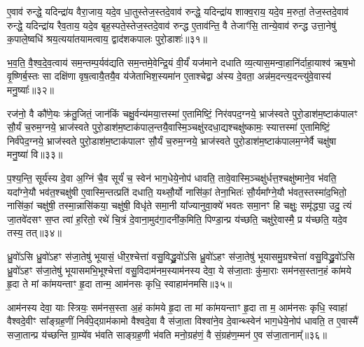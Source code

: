 ए॒वाव॑ रुन्द्धे॒ यदिन्द्रा॑य वैरा॒जाय॒ यदे॒व धा॒तुस्तेज॒स्तदे॒वाव॑ रुन्द्धे॒ यदिन्द्रा॑य शाक्व॒राय॒ यदे॒व म॒रुतां॒ तेज॒स्तदे॒वाव॑ रुन्द्धे॒ यदिन्द्रा॑य रैव॒ताय॒ यदे॒व बृह॒स्पते॒स्तेज॒स्तदे॒वाव॑ रुन्द्ध ए॒ताव॑न्ति॒ वै तेजाꣳ॑सि॒ तान्ये॒वाव॑ रुन्द्ध उत्ता॒नेषु॑ क॒पाले॒ष्वधि॑ श्रय॒त्यया॑तयामत्वाय॒ द्वाद॑शकपालः पुरो॒डाशः॑॥३१॥

भ॒व॒ति॒ वै॒श्व॒दे॒व॒त्वाय॑ सम॒न्तम्प॒र्यव॑द्यति सम॒न्तमे॒वेन्द्रि॒यं वी॒र्यं॑ यज॑माने दधाति व्य॒त्यास॒मन्वा॒हानि॑र्दाहा॒याश्व॑ ऋष॒भो वृ॒ष्णिर्ब॒स्तः सा दक्षि॑णा वृष॒त्वायै॒तयै॒व य॑जेताभिश॒स्यमा॑न ए॒ताश्चेद्वा अ॑स्य दे॒वता॒ अन्न॑म॒दन्त्य॒दन्त्यु॑वे॒वास्य॑ मनु॒ष्याः᳚॥३२॥

{\anuvakamend[{इ॒न्द्रि॒यका॑मः सवि॒तुस्तेज॒स्तत्पु॑रो॒डाशो॒\-ऽष्टात्रिꣳ॑शच्च॥७॥}]}

रज॑नो॒ वै कौ॑णे॒यः क्र॑तु॒जितं॒ जान॑किं चक्षु॒र्वन्य॑मया॒त्तस्मा॑ ए॒तामिष्टिं॒ निर॑वपद॒ग्नये॒ भ्राज॑स्वते पुरो॒डाश॑म॒ष्टाक॑पालꣳ सौ॒र्यं च॒रुम॒ग्नये॒ भ्राज॑स्वते पुरो॒डाश॑म॒ष्टाक॑पाल॒न्तयै॒वास्मि॒ञ्चक्षु॑रदधा॒द्यश्चक्षु॑ष्कामः॒ स्यात्तस्मा॑ ए॒तामिष्टिं॒ निर्व॑पेद॒ग्नये॒ भ्राज॑स्वते पुरो॒डाश॑म॒ष्टाक॑पालꣳ सौ॒र्यं च॒रुम॒ग्नये॒ भ्राज॑स्वते पुरो॒डाश॑म॒ष्टाक॑पालम॒ग्नेर्वै चक्षु॑षा मनु॒ष्या॑ वि॥३३॥

प॒श्य॒न्ति॒ सूर्य॑स्य दे॒वा अ॒ग्निं चै॒व सूर्यं॑ च॒ स्वेन॑ भाग॒धेये॒नोप॑ धावति॒ तावे॒वास्मि॒ञ्चक्षु॑र्धत्त॒श्चक्षु॑ष्माने॒व भ॑वति॒ यदा᳚ग्ने॒यौ भव॑त॒श्चक्षु॑षी ए॒वास्मि॒न्तत्प्रति॑ दधाति॒ यथ्सौ॒र्यो नासि॑कां॒ तेना॒भितः॑ सौ॒र्यमा᳚ग्ने॒यौ भ॑वत॒स्तस्मा॑द॒भितो॒ नासि॑कां॒ चक्षु॑षी॒ तस्मा॒न्नासि॑कया॒ चक्षु॑षी॒ विधृ॑ते समा॒नी या᳚ज्यानुवा॒क्ये॑ भवतः समा॒नꣳ हि चक्षुः॒ समृ॑द्ध्या॒ उदु॒ त्यं जा॒तवे॑दसꣳ स॒प्त त्वा॑ ह॒रितो॒ रथे॑ चि॒त्रं दे॒वाना॒मुद॑गा॒दनी॑क॒मिति॒ पिण्डा॒न्प्र य॑च्छति॒ चक्षु॑रे॒वास्मै॒ प्र य॑च्छति॒ यदे॒व तस्य॒ तत्॥३४॥

{\anuvakamend[{वि ह्य॑ष्टाविꣳ॑शतिश्च॥८॥}]}

ध्रु॒वो॑\-ऽसि ध्रु॒वो॑\-ऽहꣳ स॑जा॒तेषु॑ भूयासं॒ धीर॒श्चेत्ता॑ वसु॒विद्ध्रु॒वो॑\-ऽसि ध्रु॒वो॑\-ऽहꣳ स॑जा॒तेषु॑ भूयासमु॒ग्रश्चेत्ता॑ वसु॒विद्ध्रु॒वो॑\-ऽसि ध्रु॒वो॑\-ऽहꣳ स॑जा॒तेषु॑ भूयासमभि॒भूश्चेत्ता॑ वसु॒विदाम॑नम॒स्याम॑नस्य देवा॒ ये स॑जा॒ताः कु॑मा॒राः सम॑नस॒स्तान॒हं का॑मये हृ॒दा ते मां का॑मयन्ताꣳ हृ॒दा तान्म॒ आम॑नसः कृधि॒ स्वाहाम॑नमसि॥३५॥

आम॑नस्य देवा॒ याः स्त्रियः॒ सम॑नस॒स्ता अ॒हं का॑मये हृ॒दा ता मां का॑मयन्ताꣳ हृ॒दा ता म॒ आम॑नसः कृधि॒ स्वाहा॑ वैश्वदे॒वीꣳ सा᳚ङ्ग्रह॒णीं निर्व॑पे॒द्ग्राम॑कामो वैश्वदे॒वा वै स॑जा॒ता विश्वा॑ने॒व दे॒वान्थ्स्वेन॑ भाग॒धेये॒नोप॑ धावति॒ त ए॒वास्मै॑ सजा॒तान्प्र य॑च्छन्ति ग्रा॒म्ये॑व भ॑वति साङ्ग्रह॒णी भ॑वति मनो॒ग्रह॑णं॒ वै सं॒ग्रह॑ण॒म्मन॑ ए॒व स॑जा॒तानाम्᳚॥३६॥

